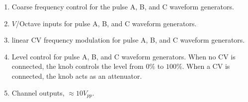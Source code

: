 \documentclass[12pt,a4paper]{article}
\begin{document}
\begin{enumerate}
  \item Coarse frequency control for the pulse A, B, and C waveform generators.
  \item $V$/Octave inputs for pulse A, B, and C waveform generators.
  \item linear CV frequency modulation for pulse A, B, and C waveform generators.
  \item Level control for pulse A, B, and C waveform generators. When no CV is connected, the knob controls the level from $0\%$ to $100\%$. When a CV is connected, the knob acts as an attenuator.
  \item Channel outputs, ${\approx}10V_{pp}$.
\end{enumerate}


\clearpage
\renewcommand\refname{References \& Acknowledgments}
\nocite{*}


\end{document}
